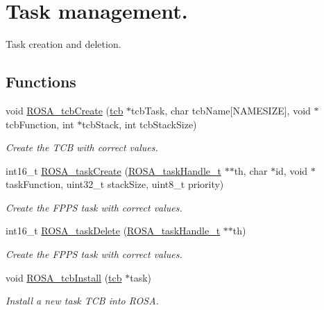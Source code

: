 \hypertarget{group__rosa__kernel__tm}{}\section{Task management.}
\label{group__rosa__kernel__tm}


Task creation and deletion.  


\subsection*{Functions}
\begin{DoxyCompactItemize}
\item 
void \mbox{\hyperlink{group__rosa__kernel__tm_ga88a553c195e2f549835cbbf4e36a71ff}{R\+O\+S\+A\+\_\+tcb\+Create}} (\mbox{\hyperlink{structtcb__record__t}{tcb}} $\ast$tcb\+Task, char tcb\+Name\mbox{[}N\+A\+M\+E\+S\+I\+ZE\mbox{]}, void $\ast$tcb\+Function, int $\ast$tcb\+Stack, int tcb\+Stack\+Size)
\begin{DoxyCompactList}\small\item\em Create the T\+CB with correct values. \end{DoxyCompactList}\item 
int16\+\_\+t \mbox{\hyperlink{group__rosa__kernel__tm_ga7b9542dcdbdadbfc94f42f85536a83b0}{R\+O\+S\+A\+\_\+task\+Create}} (\mbox{\hyperlink{rosa__def_8h_a82d32f422c2987044e833843e7620aa6}{R\+O\+S\+A\+\_\+task\+Handle\+\_\+t}} $\ast$$\ast$th, char $\ast$id, void $\ast$task\+Function, uint32\+\_\+t stack\+Size, uint8\+\_\+t priority)
\begin{DoxyCompactList}\small\item\em Create the F\+P\+PS task with correct values. \end{DoxyCompactList}\item 
int16\+\_\+t \mbox{\hyperlink{group__rosa__kernel__tm_gad0845723ed20c9e51a81a7b388dbc555}{R\+O\+S\+A\+\_\+task\+Delete}} (\mbox{\hyperlink{rosa__def_8h_a82d32f422c2987044e833843e7620aa6}{R\+O\+S\+A\+\_\+task\+Handle\+\_\+t}} $\ast$$\ast$th)
\begin{DoxyCompactList}\small\item\em Create the F\+P\+PS task with correct values. \end{DoxyCompactList}\item 
void \mbox{\hyperlink{group__rosa__kernel__tm_ga9a7bde19bc8609de66353d1f51d09eda}{R\+O\+S\+A\+\_\+tcb\+Install}} (\mbox{\hyperlink{structtcb__record__t}{tcb}} $\ast$task)
\begin{DoxyCompactList}\small\item\em Install a new task T\+CB into R\+O\+SA. \end{DoxyCompactList}\end{DoxyCompactItemize}


